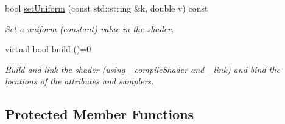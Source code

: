 \begin{DoxyCompactItemize}
bool \hyperlink{classgdl_1_1_a_shader_a882bdda898c0f8a63b3ced52f933e4ef}{set\-Uniform} (const std\-::string \&k, double v) const 
\begin{DoxyCompactList}\small\item\em Set a uniform (constant) value in the shader. \end{DoxyCompactList}\item 
virtual bool \hyperlink{classgdl_1_1_a_shader_a0717c838d5a465332be5b91d12d2dbb5}{build} ()=0
\begin{DoxyCompactList}\small\item\em Build and link the shader (using \-\_\-compile\-Shader and \-\_\-link) and bind the locations of the attributes and samplers. \end{DoxyCompactList}\end{DoxyCompactItemize}
\subsection*{Protected Member Functions}
